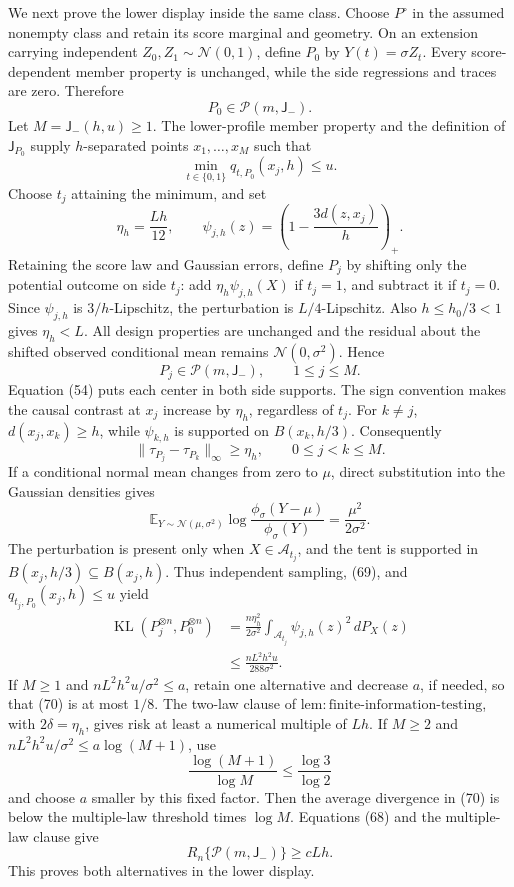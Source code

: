 We next prove the lower display inside the same class. Choose \(P^\circ\) in the assumed nonempty class and retain its score marginal and geometry. On an extension carrying independent \(Z_0,Z_1\sim\mathcal N(0,1)\), define \(P_0\) by \(Y(t)=\sigma Z_t\). Every score-dependent member property is unchanged, while the side regressions and traces are zero. Therefore
\[
 P_0\in\mathcal P(m,\mathsf J_{-}). \tag{65}
\]
Let \(M=\mathsf J_{-}(h,u)\ge1\). The lower-profile member property and the definition of \(\mathsf J_{P_0}\) supply \(h\)-separated points \(x_1,\ldots,x_M\) such that
\[
 \min_{t\in\{0,1\}}q_{t,P_0}(x_j,h)\le u.
\]
Choose \(t_j\) attaining the minimum, and set
\[
 \eta_h=\frac{Lh}{12},
 \qquad \psi_{j,h}(z)=\left(1-\frac{3d(z,x_j)}h\right)_+. \tag{66}
\]
Retaining the score law and Gaussian errors, define \(P_j\) by shifting only the potential outcome on side \(t_j\): add \(\eta_h\psi_{j,h}(X)\) if \(t_j=1\), and subtract it if \(t_j=0\). Since \(\psi_{j,h}\) is \(3/h\)-Lipschitz, the perturbation is \(L/4\)-Lipschitz. Also \(h\le h_0/3<1\) gives \(\eta_h<L\). All design properties are unchanged and the residual about the shifted observed conditional mean remains \(\mathcal N(0,\sigma^2)\). Hence
\[
 P_j\in\mathcal P(m,\mathsf J_{-}),
 \qquad 1\le j\le M. \tag{67}
\]
Equation (54) puts each center in both side supports. The sign convention makes the causal contrast at \(x_j\) increase by \(\eta_h\), regardless of \(t_j\). For \(k\ne j\), \(d(x_j,x_k)\ge h\), while \(\psi_{k,h}\) is supported on \(B(x_k,h/3)\). Consequently
\[
 \|\tau_{P_j}-\tau_{P_k}\|_\infty\ge\eta_h,
 \qquad 0\le j<k\le M. \tag{68}
\]
If a conditional normal mean changes from zero to \(\mu\), direct substitution into the Gaussian densities gives
\[
 \mathbb E_{Y\sim\mathcal N(\mu,\sigma^2)}
 \log\frac{\phi_\sigma(Y-\mu)}{\phi_\sigma(Y)}
 =\frac{\mu^2}{2\sigma^2}. \tag{69}
\]
The perturbation is present only when \(X\in\mathcal A_{t_j}\), and the tent is supported in \(B(x_j,h/3)\subseteq B(x_j,h)\). Thus independent sampling, (69), and \(q_{t_j,P_0}(x_j,h)\le u\) yield
\[
 \begin{aligned}
 \operatorname{KL}(P_j^{\otimes n},P_0^{\otimes n})
 &=\frac{n\eta_h^2}{2\sigma^2}
 \int_{\mathcal A_{t_j}}\psi_{j,h}(z)^2\,dP_X(z)\\
 &\le\frac{nL^2h^2u}{288\sigma^2}.
 \end{aligned} \tag{70}
\]
If \(M\ge1\) and \(nL^2h^2u/\sigma^2\le a\), retain one alternative and decrease \(a\), if needed, so that (70) is at most \(1/8\). The two-law clause of \(\mathrm{lem:finite\text{-}information\text{-}testing}\), with \(2\delta=\eta_h\), gives risk at least a numerical multiple of \(Lh\). If \(M\ge2\) and \(nL^2h^2u/\sigma^2\le a\log(M+1)\), use
\[
 \frac{\log(M+1)}{\log M}\le\frac{\log3}{\log2}
\]
and choose \(a\) smaller by this fixed factor. Then the average divergence in (70) is below the multiple-law threshold times \(\log M\). Equations (68) and the multiple-law clause give
\[
 R_n\{\mathcal P(m,\mathsf J_{-})\}\ge cLh. \tag{71}
\]
This proves both alternatives in the lower display.

